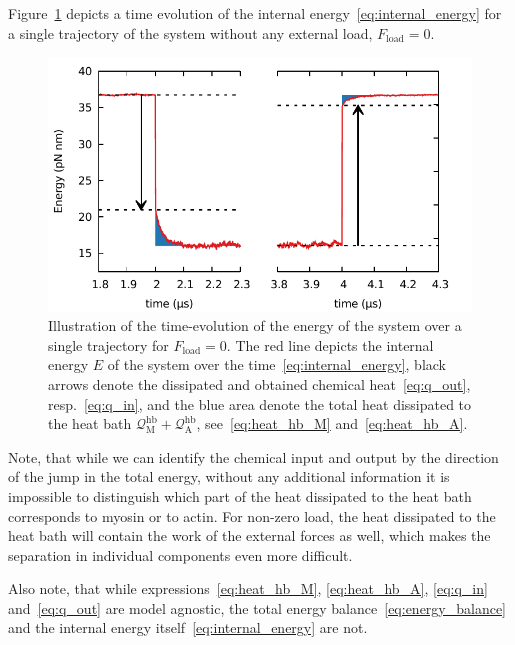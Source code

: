 \documentclass[aps,pre,twocolumn,showpacs,showkeys,superscriptaddress,floatfix]{revtex4-1}
\begin{document}
Figure~\ref{fig:energy_evolution} depicts a time evolution of the internal energy~\eqref{eq:internal_energy} for a single trajectory of the system without any external load, $F_\text{load} = 0$.
\begin{figure}
\centering
\includegraphics[width=.45\textwidth,height=!]{energy_1head.pdf}
\caption{\label{fig:energy_evolution}
Illustration of the time-evolution of the energy of the system over a single trajectory for $F_\text{load} = 0$.
The red line depicts the internal energy $E$ of the system over the time~\eqref{eq:internal_energy},
black arrows denote the dissipated and obtained chemical heat~\eqref{eq:q_out}, resp.~\eqref{eq:q_in},
and the blue area denote the total heat dissipated to the heat bath ${\mathcal Q}_\text{M}^\text{hb} + {\mathcal Q}_\text{A}^\text{hb}$, 
see~\eqref{eq:heat_hb_M} and~\eqref{eq:heat_hb_A}.
}
\end{figure}
Note, that while we can identify the chemical input and output by the direction of the jump in the total energy, 
without any additional information it is impossible to distinguish which part of the heat dissipated to the heat bath corresponds to myosin or to actin.
For non-zero load, the heat dissipated to the heat bath will contain the work of the external forces as well,
which makes the separation in individual components even more difficult.

Also note, that while expressions~\eqref{eq:heat_hb_M}, \eqref{eq:heat_hb_A}, \eqref{eq:q_in} and~\eqref{eq:q_out} are model agnostic, 
the total energy balance~\eqref{eq:energy_balance} and the internal energy itself~\eqref{eq:internal_energy} are not. 
\end{document}
